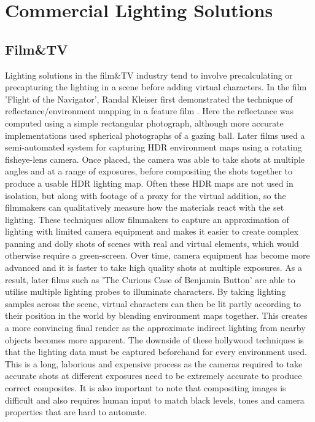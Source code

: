 \documentclass[ %
                    author={Gavin Parker},
                supervisor={Dr. Neill Campbell},
                    degree={MEng},
                     title={Deep Siamese Networks for Illumination Estimation from Stereo Images},
                  subtitle={},
                      type={research},
                      year={2018} ]{dissertation}
\begin{document}
\section{Commercial Lighting Solutions}
\subsection{Film\&TV}
Lighting solutions in the film\&TV industry tend to involve precalculating or precapturing the lighting in a scene before adding virtual characters. In the film 'Flight of the Navigator', Randal Kleiser first demonstrated the technique of reflectance/environment mapping in a feature film \cite{navigator}. Here the reflectance was computed using a simple rectangular photograph, although more accurate implementations used spherical photographs of a gazing ball. Later films used a semi-automated system for capturing HDR environment maps using a rotating fisheye-lens camera. Once placed, the camera was able to take shots at multiple angles and at a range of exposures, before compositing the shots together to produce a usable HDR lighting map. Often these HDR maps are not used in isolation, but along with footage of a proxy for the virtual addition, so the filmmakers can qualitatively measure how the materials react with the set lighting. These techniques allow filmmakers to capture an approximation of lighting with limited camera equipment and makes it easier to create complex panning and dolly shots of scenes with real and virtual elements, which would otherwise require a green-screen. Over time, camera equipment has become more advanced and it is faster to take high quality shots at multiple exposures. As a result, later films such as 'The Curious Case of Benjamin Button' are able to utilise multiple lighting probes to illuminate characters. By taking lighting samples across the scene, virtual characters can then be lit partly according to their position in the world by blending environment maps together. This creates a more convincing final render as the approximate indirect lighting from nearby objects becomes more apparent. The downside of these hollywood techniques is that the lighting data must be captured beforehand for every environment used. This is a long, laborious and expensive process as the cameras required to take accurate shots at different exposures need to be extremely accurate to produce correct composites. It is also important to note that compositing images is difficult and also requires human input to match black levels, tones and camera properties that are hard to automate.
\end{document}
